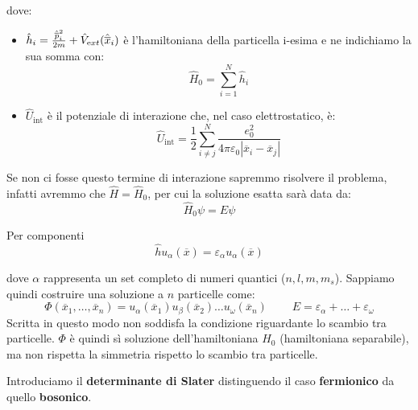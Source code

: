 \noindent dove:
\begin{itemize}
    \item $\hat h_i=\frac{{\hat{\overline{p}}}_i^2}{2m}+\hat V_{\text ext}(\hat{\overline{x}}_i)$ è l'hamiltoniana della particella i-esima e ne indichiamo la sua somma con:
    \begin{equation*}
        \hat H_0 = \sum_{i=1}^N \hat h_i
    \end{equation*}
    \item $\hat U_{\text{int}}$ è il potenziale di interazione che, nel caso elettrostatico, è: 
    \begin{equation*}
        \hat U_{\text{int}}=\frac 12 \sum_{i \neq j}^N\frac{e_0^2}{4\pi\varepsilon_0|\overline x_i - \overline x_j|}
    \end{equation*}
\end{itemize}

\noindent Se non ci fosse questo termine di interazione sapremmo risolvere il problema, infatti avremmo che $\hat H = \hat H_0$, per cui la soluzione esatta sarà data da:
\begin{equation*}
    \hat H_0\psi = E \psi 
\end{equation*}

\noindent Per componenti
\begin{equation*}
    \hat h u_\alpha(\overline x) = \varepsilon_\alpha u_\alpha(\overline x)
\end{equation*}

\noindent dove $\alpha$ rappresenta un set completo di numeri quantici ($n, l, m, m_s$). Sappiamo quindi costruire una soluzione a $n$ particelle come:
\begin{equation*}
    \Phi(\overline{x}_1, \dots, \overline{x}_n)=u_\alpha(\overline{x}_1)u_\beta(\overline{x}_2)\dots u_\omega(\overline{x}_n)
    \ \ \ \ \ \ \ \ \ \
    E = \varepsilon_\alpha + \dots + \varepsilon_\omega
\end{equation*}
\noindent Scritta in questo modo non soddisfa la condizione riguardante lo scambio tra particelle. $\Phi$ è quindi sì soluzione dell'hamiltoniana $H_0$ (hamiltoniana separabile), ma non rispetta la simmetria rispetto lo scambio tra particelle.

\noindent Introduciamo il \textbf{determinante di Slater} distinguendo il caso \textbf{fermionico} da quello \textbf{bosonico}.

